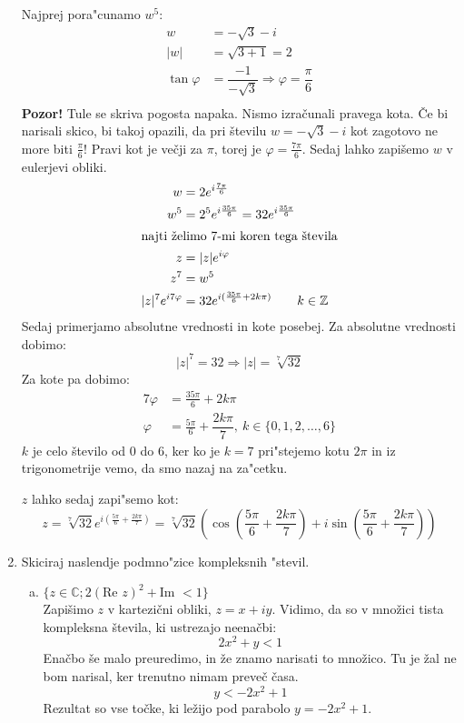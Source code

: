 \documentclass[12pt,a4paper,slovene]{article}
\newcommand{\ZZ}{\mathbb{Z}}
\begin{document}
\begin{enumerate}[(1)]
	Najprej pora"cunamo $w^5$:
	\begin{align*}
	w &= -\sqrt{3} - i\\
	|w| &= \sqrt{3 + 1} = 2\\
	\tan \varphi &= \dfrac{-1}{-\sqrt{3}} \Rightarrow \varphi = \dfrac{\pi}{6}\\
    \end{align*}
    \textbf{Pozor!} Tule se skriva pogosta napaka. Nismo izračunali pravega kota. Če bi narisali skico, bi takoj opazili, da pri številu $w = -\sqrt{3} - i$ kot zagotovo ne more biti $\frac{\pi}{6}$! Pravi kot je večji za $\pi$, torej je $\varphi = \frac{7 \pi}{6}$. Sedaj lahko zapišemo $w$ v eulerjevi obliki.
    \begin{align*}
    w &= 2e^{i\frac{7\pi}{6}}\\
    w^5 &= 2^5 e^{i\frac{35\pi}{6}} = 32 e^{i\frac{35\pi}{6}}\\
    \intertext{najti želimo 7-mi koren tega števila}
    z &= |z|e^{i\varphi}\\
	z^7 &= w^5\\
	|z|^7 e^{i7\varphi} &= 32 e^{i(\frac{35\pi}{6} + 2k\pi)}\qquad k \in \ZZ
	\end{align*}
	Sedaj primerjamo absolutne vrednosti in kote posebej. Za absolutne vrednosti dobimo:
	\begin{equation*}
	|z|^7 = 32 \Rightarrow |z| = \sqrt[7]{32}
	\end{equation*}
	Za kote pa dobimo:
	\begin{align*}
	7\varphi &= \frac{35\pi}{6} + 2k\pi\\
	\varphi &= \frac{5\pi}{6} + \dfrac{2k\pi}{7},\ k \in \{0, 1, 2, \ldots , 6\}
	\end{align*}
	$k$ je celo število od $0$ do $6$, ker ko je $k = 7$ pri"stejemo kotu $2\pi$ in iz trigonometrije vemo, da smo nazaj na za"cetku.
	
	$z$ lahko sedaj zapi"semo kot:
	\begin{equation*}
	z = \sqrt[7]{32} e^{i\left(\frac{5\pi}{6} + \frac{2k\pi}{7}\right)} = \sqrt[7]{32}\left(\cos \left(\dfrac{5\pi}{6} + \dfrac{2k\pi}{7}\right) +i\sin \left(\dfrac{5\pi}{6} + \dfrac{2k\pi}{7} \right)\right)
	\end{equation*}
	 	
	\item Skiciraj naslendje podmno"zice kompleksnih "stevil.
	
    \begin{enumerate}[(a)]
        \item $\{z \in \mathbb{C}; 2 (\text{Re } z)^2 + \text{Im } < 1 \}$\\
        Zapišimo $z$ v kartezični obliki, $z = x + iy$. Vidimo, da so v množici tista kompleksna števila, ki ustrezajo neenačbi:
        \[
        2x^2 + y < 1
        \]
        Enačbo še malo preuredimo, in že znamo narisati to množico. Tu je žal ne bom narisal, ker trenutno nimam preveč časa.
        \[
        y < -2x^2 + 1
        \]
        Rezultat so vse točke, ki ležijo pod parabolo $y = -2x^2 + 1$.
        

\end{enumerate}
\end{enumerate}
\end{document}
